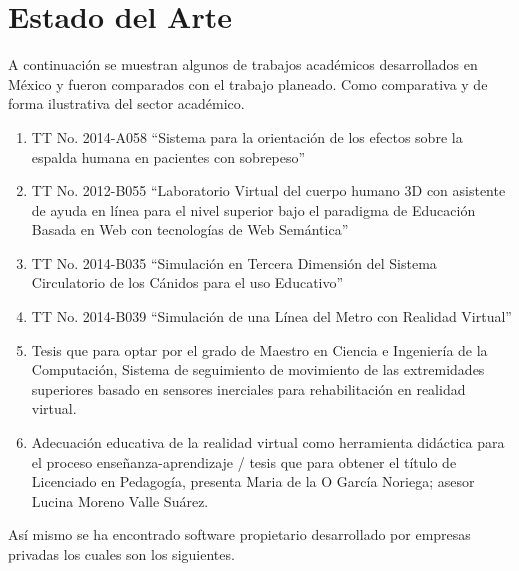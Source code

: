 \section{Estado del Arte}
A continuación se muestran algunos de trabajos académicos desarrollados en México y fueron comparados con el trabajo planeado. Como comparativa y de forma ilustrativa del sector académico.\\
\newline
\begin{enumerate}
\item TT No. 2014-A058 “Sistema para la orientación de los efectos sobre la espalda humana en pacientes con sobrepeso”\cite{tt1}
\item TT No. 2012-B055 “Laboratorio Virtual del cuerpo humano 3D con asistente de ayuda en línea para el nivel superior bajo el paradigma de Educación Basada en Web con tecnologías de Web Semántica”\cite{tt2}
\item TT No. 2014-B035 “Simulación en Tercera Dimensión del Sistema Circulatorio de los Cánidos para el uso Educativo”\cite{tt3}
\item TT No. 2014-B039 “Simulación de una Línea del Metro con Realidad Virtual”\cite{tt4}
\item Tesis que para optar por el grado de Maestro en Ciencia e Ingeniería de la Computación, Sistema de seguimiento de movimiento de las extremidades superiores basado en sensores inerciales para rehabilitación en realidad virtual.\cite{masterthesis1}
\item Adecuación educativa de la realidad virtual como herramienta didáctica para el proceso enseñanza-aprendizaje / tesis que para obtener el título de Licenciado en Pedagogía, presenta Maria de la O García Noriega; asesor Lucina Moreno Valle Suárez.\cite{te1}
\end{enumerate}
Así mismo se ha encontrado software propietario desarrollado por empresas privadas los cuales son los siguientes.\\
